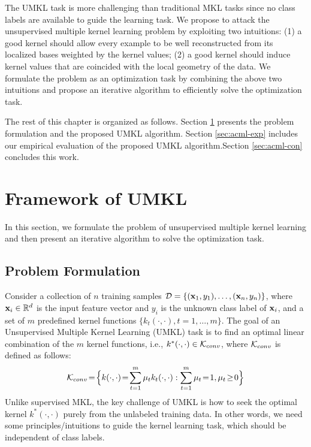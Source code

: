 The UMKL task is more challenging than traditional MKL tasks since no class labels are available to guide the learning task. We propose to attack the unsupervised multiple kernel learning problem by exploiting two intuitions: (1) a good kernel should allow every example to be well reconstructed from its localized bases weighted by the kernel values; (2) a good kernel should induce kernel values that are coincided with the local geometry of the data. We formulate the problem as an optimization task by combining the above two intuitions and propose an iterative algorithm to efficiently solve the optimization task.

The rest of this chapter is organized as follows. Section \ref{sec:acml-umkl} presents the problem formulation and the proposed UMKL algorithm. Section \ref{sec:acml-exp} includes our empirical evaluation of the proposed UMKL algorithm.Section \ref{sec:acml-con} concludes this work.


\section{Framework of UMKL} \label{sec:acml-umkl}

In this section, we formulate the problem of unsupervised multiple kernel learning and then present an iterative algorithm to solve the optimization task.

\subsection{Problem Formulation}

Consider a collection of $n$ training samples $\mathcal D = \{(\mathbf{x}_1, y_1),\ldots,(\mathbf{x}_n, y_n)\}$, where $\mathbf{x}_i\in\mathbb{R}^d$ is the input feature vector
and $y_i$ is the unknown class label of $\mathbf{x}_i$, and a set of $m$ predefined kernel functions $\{k_t(\cdot,\cdot),t=1,\ldots,m\}$. The goal of an Unsupervised Multiple Kernel Learning (UMKL) task is to find an optimal linear combination of the $m$ kernel functions, i.e., $k^*(\cdot,\cdot)\in{\mathcal K}_{conv}$, where ${\mathcal K}_{conv}$ is defined as follows:
\begin{equation}
\k_{conv} \!=\!\Big\{k(\cdot,\cdot) \!=\! \sum_{t=1}^m \mu_t k_t(\cdot,\cdot): \sum_{t=1}^m\mu_t  \!=\! 1,\mu_t \!\geq\! 0\Big\}\label{eqn:convex-mkl}
\end{equation}
Unlike supervised MKL, the key challenge of UMKL is how to seek the optimal kernel $k^*(\cdot,\cdot)$ purely from the unlabeled training data. In other words, we need some principles/intuitions to guide the kernel learning task, which should be independent of class labels.

